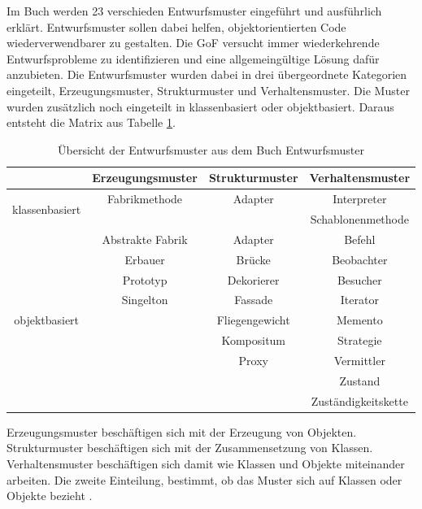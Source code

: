 Im Buch werden 23 verschieden Entwurfsmuster eingeführt und ausführlich erklärt. Entwurfsmuster sollen dabei helfen, objektorientierten Code wiederverwendbarer zu gestalten. Die \ac{GoF} versucht immer wiederkehrende Entwurfsprobleme zu identifizieren und eine allgemeingültige Lösung dafür anzubieten. Die Entwurfsmuster wurden dabei in drei übergeordnete Kategorien eingeteilt, Erzeugungsmuster, Strukturmuster und Verhaltensmuster. Die Muster wurden zusätzlich noch eingeteilt in klassenbasiert oder objektbasiert. Daraus entsteht die Matrix aus Tabelle \ref{tab:pattern}.\\

\begin{table}[h]
	\centering
	\caption[Übersicht der Entwurfsmuster aus dem Buch Entwurfsmuster]{Übersicht der Entwurfsmuster aus dem Buch Entwurfsmuster \cite{noauthor2011EntwurfsmusterElemente} }
	\label{tab:pattern}
	\begin{tabular}{|c|c|c|c|}\cline{2-4}
		\multicolumn{1}{c|}{} 			& Erzeugungsmuster  & Strukturmuster 	& Verhaltensmuster	 \\ \hline
		\multirow{2}{*}{klassenbasiert} & Fabrikmethode  	&  Adapter 			& Interpreter		 \\
		 								&				 	&					& Schablonenmethode	 \\ \hline
		\multirow{9}{*}{objektbasiert} 	& Abstrakte Fabrik  & Adapter  			& Befehl			 \\
										& Erbauer			& Brücke			& Beobachter		 \\
										& Prototyp			& Dekorierer		& Besucher			 \\
										& Singelton			& Fassade			& Iterator			 \\
										&					& Fliegengewicht	& Memento			 \\
										&					& Kompositum		& Strategie			 \\
										&					& Proxy				& Vermittler		 \\
										&					&					& Zustand			 \\
										&					&					& Zuständigkeitskette\\ \hline
	\end{tabular} 
	
\end{table} 

Erzeugungsmuster beschäftigen sich mit der Erzeugung von Objekten. Strukturmuster beschäftigen sich mit der Zusammensetzung von Klassen. Verhaltensmuster beschäftigen sich damit wie Klassen und Objekte miteinander arbeiten. Die zweite Einteilung, bestimmt, ob das Muster sich auf Klassen oder Objekte bezieht \cite{noauthor2011EntwurfsmusterElemente}. \\

